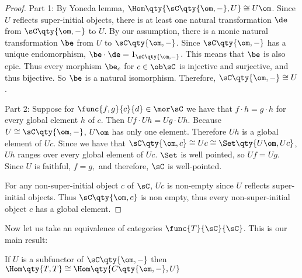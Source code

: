 \documentclass[main.tex]{subfiles}
\begin{document}
\begin{proof}

	Part 1:
	By Yoneda lemma, $\Hom\qty{\sC\qty{\om,-},U} \cong U\om$. Since $U$
	reflects super-initial objects, there is at least one natural
	transformation $\de$ from $\sC\qty{\om,-}$ to $U$. By our assumption, there
	is a monic natural transformation $\be$ from $U$ to $\sC\qty{\om,-}$. Since
	$\sC\qty{\om,-}$ has a unique endomorphism, $\be \cdot \de =
	1_{\sC\qty{\om,-}}$. This means that $\be$ is also epic. Thus every
	morphism $\be_{c}$ for $c \in \ob \sC$ is injective and surjective, and
	thus bijective. So $\be$ is a natural isomorphism. Therefore,
	$\sC\qty{\om,-} \cong U$.

	Part 2: Suppose for $\func{f,g}{c}{d} \in \mor \sC$ we have that $f \cdot h
	= g \cdot h$ for every global element $h$ of $c$. Then $Uf \cdot Uh = Ug
	\cdot Uh.$ Because $U \cong \sC\qty{\om,-}$, $U\om$ has only one element.
	Therefore $Uh$ is a global element of $Uc$. Since we have that $\sC\qty{\om,c}
	\cong Uc \cong \Set\qty{U\om,Uc}$, $Uh$ ranges over every global
	element of $Uc$. $\Set$ is well pointed, so $Uf = Ug$. Since $U$ is
	faithful, $f = g,$ and therefore, $\sC$ is well-pointed.

	For any non-super-initial object $c$ of $\sC$, $Uc$ is non-empty since $U$
	reflects super-initial objects. Thus $\sC\qty{\om,c}$ is non empty, thus
	every non-super-initial object $c$ has a global element.


\end{proof}

Now let us take an equivalence of categories $\func{T}{\sC}{\sC}$. This is our main result:

\begin{theorem}

If $U $ is a subfunctor of  $\sC\qty{\om,-}$ then $\Hom\qty{T,T} \cong
\Hom\qty{C\qty{\om,-},U }$

\end{theorem}
\end{document}
